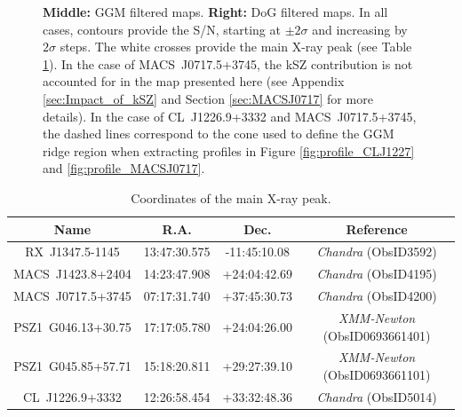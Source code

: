 \documentclass[traditabstract]{aa}
\begin{document}
\begin{figure}[p]
{{{\bf Middle:} GGM filtered maps.
{\bf Right:} DoG filtered maps.
In all cases, contours provide the S/N, starting at $\pm 2 \sigma$ and increasing by $2 \sigma$ steps. The white crosses provide the main X-ray peak (see Table \ref{tab:xray_peak}). In the case of \mbox{MACS~J0717.5+3745}, the kSZ contribution is not accounted for in the map presented here (see Appendix \ref{sec:Impact_of_kSZ} and Section \ref{sec:MACSJ0717} for more details). In the case of \mbox{CL~J1226.9+3332} and \mbox{MACS~J0717.5+3745}, the dashed lines correspond to the cone used to define the GGM ridge region when extracting profiles in Figure \ref{fig:profile_CLJ1227} and \ref{fig:profile_MACSJ0717}.}}
\label{fig:NIKA_cluster_sample}
\end{figure}

\begin{table}[]
\caption{\footnotesize{Coordinates of the main X-ray peak.}}
\begin{center}
\resizebox{0.5\textwidth}{!} {
\begin{tabular}{c|c|c|c}
\hline
\hline
Name & R.A. & Dec. & Reference \\
\hline
RX~J1347.5-1145 & 13:47:30.575 & -11:45:10.08 & \textit{Chandra} (ObsID3592) \\ 
MACS~J1423.8+2404 & 14:23:47.908 & +24:04:42.69 & \textit{Chandra} (ObsID4195) \\ 
MACS~J0717.5+3745 & 07:17:31.740 & +37:45:30.73 & \textit{Chandra} (ObsID4200) \\ 
PSZ1~G046.13+30.75 & 17:17:05.780 & +24:04:26.00 & \textit{XMM-Newton} (ObsID0693661401) \\ 
PSZ1~G045.85+57.71 & 15:18:20.811 & +29:27:39.10 & \textit{XMM-Newton} (ObsID0693661101) \\ 
CL~J1226.9+3332 & 12:26:58.454 & +33:32:48.36 & \textit{Chandra} (ObsID5014) \\ 
\hline
\end{tabular}
}
\end{center}
\label{tab:xray_peak}
\end{table}
\end{document}
